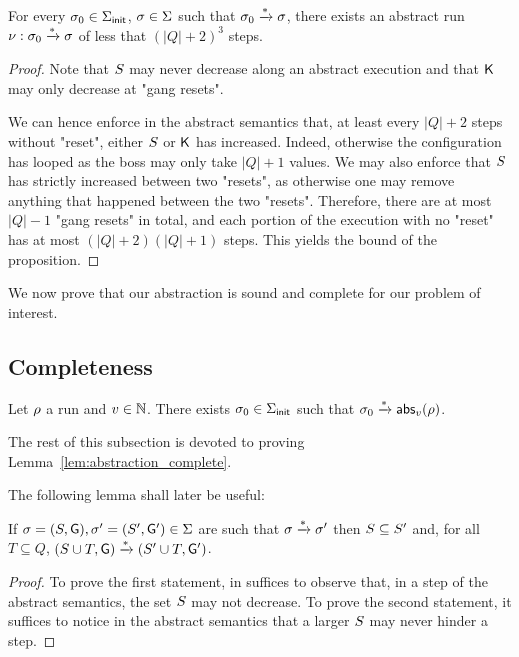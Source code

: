 \begin{proposition}
For every $\sigma_0 \in \Sigma_{\mathsf{init}}$, $\sigma \in \Sigma$ such that $\sigma_0 \xrightarrow{*} \sigma$, there exists an abstract run $\nu: \sigma_0 \xrightarrow{*} \sigma$ of less that $(|Q|+2)^3$ steps.
\end{proposition}
\begin{proof}
Note that $S$ may never decrease along an abstract execution and that $\mathsf{K}$ may only decrease at "gang resets".

We can hence enforce in the abstract semantics that, at least every $|Q|+2$ steps without "reset", either $S$ or $\mathsf{K}$ has increased. Indeed, otherwise the configuration has looped as the boss may only take $|Q| +1$ values. We may also enforce that $S$ has strictly increased between two "resets", as otherwise one may remove anything that happened between the two "resets". Therefore, there are at most $|Q|-1$ "gang resets" in total, and each portion of the execution with no "reset" has at most $(|Q|+2)(|Q|+1)$ steps. This yields the bound of the proposition. 
\end{proof}

We now prove that our abstraction is sound and complete for our problem of interest. 

\subsection{Completeness}

\begin{lemma}
\label{lem:abstraction_complete}
Let $\rho$ a run and $v \in \mathbb{N}$. There exists $\sigma_0 \in \Sigma_{\mathsf{init}}$ such that $\sigma_0 \xrightarrow{*} \mathsf{abs}_{v}(\rho)$. 
\end{lemma}
The rest of this subsection is devoted to proving Lemma~\ref{lem:abstraction_complete}.

The following lemma shall later be useful:
\begin{lemma}
\label{lem:adding_states_in_covset}
If $\sigma = (S, \mathsf{G}), \sigma' = (S', \mathsf{G}') \in \Sigma$ are such that $\sigma \xrightarrow{*} \sigma'$ then $S \subseteq S'$ and, for all $T \subseteq Q$, $(S \cup T, \mathsf{G}) \xrightarrow{*} (S' \cup T, \mathsf{G}')$. 
\end{lemma}
\begin{proof}
To prove the first statement, in suffices to observe that, in a step of the abstract semantics, the set $S$ may not decrease.
To prove the second statement, it suffices to notice in the abstract semantics that a larger $S$ may never hinder a step. 
\end{proof}

